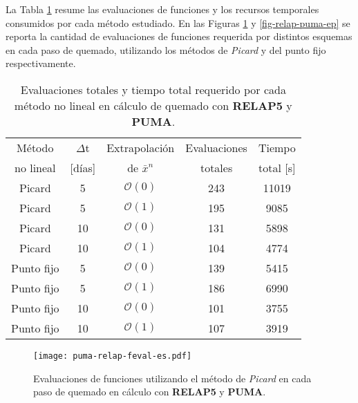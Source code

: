 La Tabla \ref{tab-relap-puma} resume las evaluaciones de funciones y los recursos temporales consumidos por cada método estudiado.
En las Figuras \ref{fig-relap-puma-es} y \ref{fig-relap-puma-ep} se reporta la cantidad de evaluaciones de funciones requerida por distintos esquemas en cada paso de quemado,
utilizando los métodos de \textit{Picard} y del punto fijo respectivamente.

\begin{table}[h!]
  \centering
  \begin{tabular}{ c c c c c } 
      \hline
      \multicolumn{1}{c}{Método} & \multirow{1}{*}{$\Delta$t} & \multicolumn{1}{c}{Extrapolación} & \multicolumn{1}{c}{Evaluaciones} & \multicolumn{1}{c}{Tiempo} \\ %
      \multicolumn{1}{c}{no lineal} & [días] & \multicolumn{1}{c}{de $\bar{x}^n$} & \multicolumn{1}{c}{totales} & \multicolumn{1}{c}{total [s]}\\ \hline %
      Picard & 5 & $\mathscr{O}(0)$ & 243 & 11019 \\ %
      Picard & 5 & $\mathscr{O}(1)$ & 195 & 9085  \\ %
      Picard & 10 & $\mathscr{O}(0)$ & 131 & 5898 \\ %
      Picard & 10 & $\mathscr{O}(1)$ & 104 & 4774 \\ %
      Punto fijo & 5 & $\mathscr{O}(0)$ & 139 & 5415 \\ %
      Punto fijo & 5 & $\mathscr{O}(1)$ & 186 & 6990 \\ %
      Punto fijo & 10 & $\mathscr{O}(0)$ & 101 & 3755  \\ %
      Punto fijo & 10 & $\mathscr{O}(1)$ & 107 & 3919  \\ \hline            
   \end{tabular}   
   \caption[Evaluaciones totales y tiempo total requerido por cada método no lineal en cálculo de quemado con \textbf{RELAP5} y \textbf{Fermi}]
   {Evaluaciones totales y tiempo total requerido por cada método no lineal en cálculo de quemado con \textbf{RELAP5} y \textbf{PUMA}.}
   \label{tab-relap-puma}
\end{table}

\begin{figure}[h!]
  \centering
  \texttt{[image: puma-relap-feval-es.pdf]}  
  \caption[Evaluaciones de funciones utilizando el método de \textit{Picard} en cada paso de quemado en cálculo con \textbf{RELAP5} y \textbf{Fermi}]
  {Evaluaciones de funciones utilizando el método de \textit{Picard} en cada paso de quemado en cálculo con \textbf{RELAP5} y \textbf{PUMA}.}
  \label{fig-relap-puma-es}
\end{figure}


